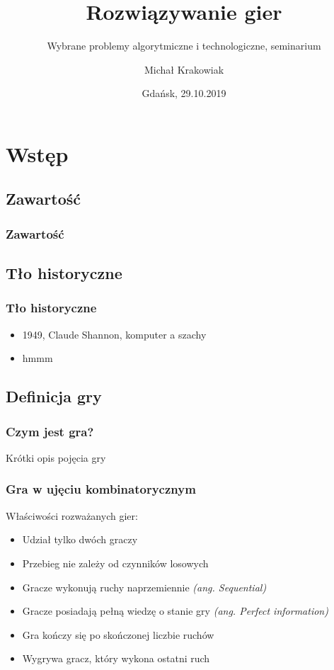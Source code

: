 \documentclass[polish,envcountsect,10pt]{beamer}
\title{Rozwiązywanie gier}
\author{Michał Krakowiak}
\subtitle{Wybrane problemy algorytmiczne i technologiczne, seminarium}
\date{Gdańsk, 29.10.2019}
\begin{document}
    \frame{\titlepage}
    \section{Wstęp}
        \subsection{Zawartość}
            \begin{frame}
                \frametitle{Zawartość}
                \begin{multicols}{2}
                    \tableofcontents[pausesections]                    
                \end{multicols}
            \end{frame}
        \subsection{Tło historyczne}
            \begin{frame}
                \frametitle{Tło historyczne}
                \begin{itemize}
                    \item<1-> 1949, Claude Shannon, komputer a szachy
                    \item<2-> hmmm
                \end{itemize}
            \end{frame}
        \subsection{Definicja gry}
            \begin{frame}
                \frametitle{Czym jest gra?}
                Krótki opis pojęcia gry
            \end{frame}
            \begin{frame}
                \frametitle{Gra w ujęciu kombinatorycznym}
                Właściwości rozważanych gier:
                \begin{itemize}
                    \item<2-> Udział tylko dwóch graczy
                    \item<3-> Przebieg nie zależy od czynników losowych
                    \item<4-> Gracze wykonują ruchy naprzemiennie \textit{(ang. Sequential)}
                    \item<5-> Gracze posiadają pełną wiedzę o stanie gry \textit{(ang. Perfect information)}
                    \item<6-> Gra kończy się po skończonej liczbie ruchów
                    \item<7-> Wygrywa gracz, który wykona ostatni ruch
                \end{itemize}
            \end{frame}
\end{document}
